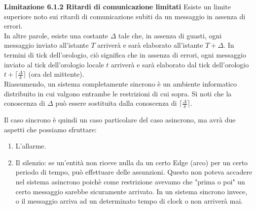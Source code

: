 \textbf{Limitazione 6.1.2 Ritardi di comunicazione limitati} Esiste un limite
superiore noto sui ritardi di comunicazione subiti da un messaggio in assenza di
errori.\\
In altre parole, esiste una costante $\Delta$ tale che, in assenza di guasti,
ogni messaggio inviato all'istante $T$ arriverà e sarà elaborato all'istante $T
    + \Delta$. In termini di tick dell'orologio, ciò significa che in assenza di
errori, ogni messaggio inviato al tick dell'orologio locale $t$ arriverà e sarà
elaborato dal tick dell'orologio $t + \lceil \frac{\Delta}{\delta} \rceil$ (ora
del mittente).\\

Riassumendo, un sistema completamente sincrono è un ambiente informatico
distribuito in cui valgono entrambe le restrizioni di cui sopra. Si noti che la
conoscenza di $\Delta$ può essere sostituita dalla conoscenza di $\lceil
    \frac{\Delta}{\delta} \rceil$.

Il caso sincrono è quindi un caso particolare del caso asincrono, ma avrà due
aspetti che possiamo sfruttare:
\begin{enumerate}
    \item L'allarme.
    \item Il silenzio: se un'entità non riceve nulla da un certo Edge (arco) per
          un certo periodo di tempo, può effettuare delle assunzioni. Questo non poteva
          accadere nel sistema asincrono poichè come restrizione avevamo che "prima o
          poi" un certo messaggio sarebbe sicuramente arrivato.  In un sistema sincrono
          invece, o il messaggio arriva ad un determinato tempo di clock o non arriverà
          mai.
\end{enumerate}

